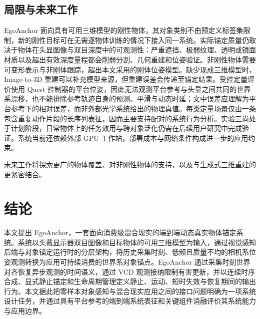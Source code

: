 \documentclass[9pt,twocolumn,letterpaper]{extarticle}
\begin{document}
\subsection{局限与未来工作}


EgoAnchor 面向具有可用三维模型的刚性物体，其对象类别不由预定义标签集限制，新的刚性目标可在无需逐物体训练的情况下接入同一系统。实际锚定质量仍取决于物体在头显图像与双目深度中的可观测性：严重遮挡、极弱纹理、透明或镜面材质以及超出有效深度量程都会削弱分割、几何重建和位姿验证。非刚性物体需要可变形表示与非刚体跟踪，超出本文采用的刚体位姿模型。缺少现成三维模型时，Image-to-3D 重建可以补充模型来源，但重建误差会传递至锚定结果。受控定量评价使用 Quest 控制器的平台位姿，因此无法观测平台参考与头显之间共同的世界系漂移，也不能排除参考轨迹自身的预测、平滑与动态时延；文中误差应理解为平台参考下的相对误差，而非外部光学系统给出的物理真值。每类定量场景仅由一条包含重复动作片段的长序列表征，因而主要支持配对的系统行为分析。实验三尚处于计划阶段，日常物体上的任务效用与跨对象泛化仍需在后续用户研究中完成验证。系统当前还依赖外部 GPU 工作站，部署成本与网络条件构成进一步的应用约束。

未来工作将探索更广的物体覆盖、对非刚性物体的支持，以及与生成式三维重建的更紧密结合。

\section{结论}\label{sec:conclusion}

本文提出 EgoAnchor，一套面向消费级混合现实的端到端动态真实物体锚定系统。系统以头戴显示器双目图像和目标物体的可用三维模型为输入，通过视觉感知后端与对象锚定运行时的分层架构，将历史采集时刻、低频且质量不均的相机系位姿观测转换为应用可持续消费的世界系对象锚点。EgoAnchor 通过采集时刻世界对齐恢复异步观测的时间语义，通过 VCD 观测接纳限制有害更新，并以连续时序合成、显式静止锚定和生命周期管理定义静止、运动、短时失效与恢复期间的输出行为。本文据此把零样本对象感知与混合现实应用之间的接口问题明确为一项系统设计任务，并通过具有平台参考的端到端系统表征和关键组件消融评价其系统能力与应用边界。




\end{document}
